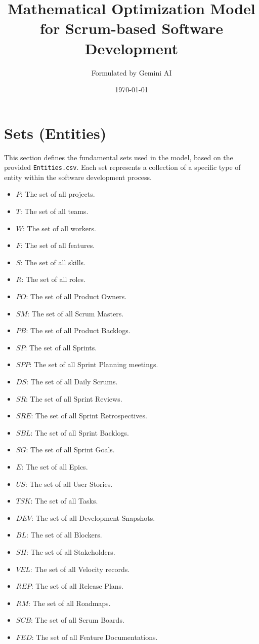 \documentclass[11pt, a4paper]{article}
\title{Mathematical Optimization Model for Scrum-based Software Development}
\author{Formulated by Gemini AI}
\date{\today}
\begin{document}
\maketitle
\thispagestyle{empty}

\newpage
\tableofcontents
\thispagestyle{empty}

\newpage
\section{Sets (Entities)}
\label{sec:sets}
This section defines the fundamental sets used in the model, based on the provided \texttt{Entities.csv}. Each set represents a collection of a specific type of entity within the software development process.

\begin{itemize}
    \item $P$: The set of all projects.
    \item $T$: The set of all teams.
    \item $W$: The set of all workers.
    \item $F$: The set of all features.
    \item $S$: The set of all skills.
    \item $R$: The set of all roles.
    \item $PO$: The set of all Product Owners.
    \item $SM$: The set of all Scrum Masters.
    \item $PB$: The set of all Product Backlogs.
    \item $SP$: The set of all Sprints.
    \item $SPP$: The set of all Sprint Planning meetings.
    \item $DS$: The set of all Daily Scrums.
    \item $SR$: The set of all Sprint Reviews.
    \item $SRE$: The set of all Sprint Retrospectives.
    \item $SBL$: The set of all Sprint Backlogs.
    \item $SG$: The set of all Sprint Goals.
    \item $E$: The set of all Epics.
    \item $US$: The set of all User Stories.
    \item $TSK$: The set of all Tasks.
    \item $DEV$: The set of all Development Snapshots.
    \item $BL$: The set of all Blockers.
    \item $SH$: The set of all Stakeholders.
    \item $VEL$: The set of all Velocity records.
    \item $REP$: The set of all Release Plans.
    \item $RM$: The set of all Roadmaps.
    \item $SCB$: The set of all Scrum Boards.
    \item $FED$: The set of all Feature Documentations.
\end{itemize}
\end{document}
